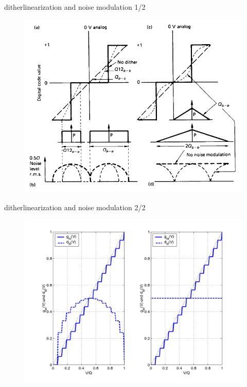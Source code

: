 	\begin{frame}{dither}{linearization and noise modulation 1/2}
	    \begin{figure}
			\begin{center}
				\includegraphics[scale=0.5]{Graph/dither_and_noisemodulation}
			\end{center}
		\end{figure}
	\end{frame}	
	\begin{frame}{dither}{linearization and noise modulation 2/2}
		\begin{figure}
			\begin{center}
					\includegraphics[scale=0.5]{Graph/rauschmodulation}
			\end{center}
		\end{figure}	
	\end{frame}	
